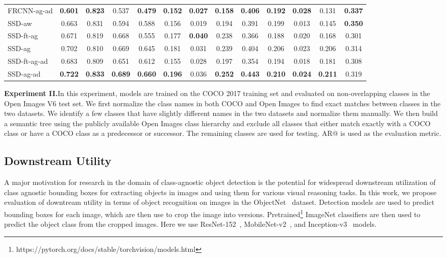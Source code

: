 \documentclass[10pt,twocolumn,letterpaper]{article}
\begin{document}
\begin{table*}
\begin{tabular}{l c c c c c c c c c c c c}
 FRCNN-ag-ad & \textbf{0.601} & \textbf{0.823} & 0.537 & \textbf{0.479} & \textbf{0.152} & \textbf{0.027} & \textbf{0.158} & \textbf{0.406} & \textbf{0.192} & \textbf{0.028} & 0.131 & \textbf{0.337} \\
 \cmidrule(r){1-1} \cmidrule(lr){2-9} \cmidrule(lr){10-13}
 SSD-aw & 0.663 & 0.831 & 0.594 & 0.588 & 0.156 & 0.019 & 0.194 & 0.391 & 0.199 & 0.013 & 0.145 & \textbf{0.350} \\
 SSD-ft-ag & 0.671 & 0.819 & 0.668 & 0.555 & 0.177 & \textbf{0.040} & 0.238 & 0.366 & 0.188 & 0.020 & 0.168 & 0.301 \\
 SSD-ag & 0.702 & 0.810 & 0.669 & 0.645 & 0.181 & 0.031 & 0.239 & 0.404 & 0.206 & 0.023 & 0.206 & 0.314 \\
 SSD-ft-ag-ad & 0.683 & 0.809 & 0.651 & 0.612 & 0.155 & 0.028 & 0.197 & 0.354 & 0.194 & 0.018 & 0.181 & 0.308 \\
 SSD-ag-ad & \textbf{0.722} & \textbf{0.833} & \textbf{0.689} & \textbf{0.660} & \textbf{0.196} & 0.036 & \textbf{0.252} & \textbf{0.443} & \textbf{0.210} & \textbf{0.024} & \textbf{0.211} & 0.319 \\
\bottomrule
\end{tabular}
\vspace{-5pt}
\end{table*}

\vspace{1pt}
\noindent\textbf{Experiment II.}\quad In this experiment, models are trained on the COCO 2017 training set and evaluated on non-overlapping classes in the Open Images V6 test set. We first normalize the class names in both COCO and Open Images to find exact matches between classes in the two datasets. We identify a few classes that have slightly different names in the two datasets and normalize them manually. We then build a semantic tree using the publicly available Open Images class hierarchy and exclude all classes that either match exactly with a COCO class or have a COCO class as a predecessor or successor. The remaining classes are used for testing. AR@ is used as the evaluation metric.


\subsection{Downstream Utility}
\label{subsec:downstream}

A major motivation for research in the domain of class-agnostic object detection is the potential for widespread downstream utilization of class agnostic bounding boxes for extracting objects in images and using them for various visual reasoning tasks. In this work, we propose evaluation of downtream utility in terms of object recognition on images in the ObjectNet~\cite{bib:objectnet} dataset. Detection models are used to predict  bounding boxes for each image, which are then use to crop the image into  versions. Pretrained\footnote{https://pytorch.org/docs/stable/torchvision/models.html} ImageNet classifiers are then used to predict the object class from the cropped images. Here we use ResNet-152~\cite{bib:resnet}, MobileNet-v2~\cite{bib:mobilenetv2}, and Inception-v3~\cite{bib:inceptionv3} models.
\end{document}
